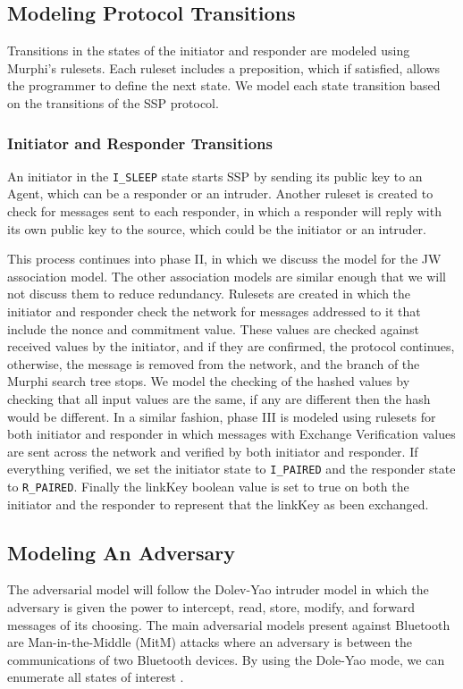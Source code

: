 \documentclass{acm_proc_article-sp}
\begin{document}
\subsection{Modeling Protocol Transitions}
Transitions in the states of the initiator and responder are modeled using Murphi's rulesets. Each ruleset includes a preposition, which if satisfied, allows the programmer to define the next state. We model each state transition based on the transitions of the SSP protocol.

\subsubsection{Initiator and Responder Transitions}

An initiator in the \texttt{I\_SLEEP} state starts SSP by sending its public key to an Agent, which can be a responder or an intruder. Another ruleset is created to check for messages sent to each responder, in which a responder will reply with its own public key to the source, which could be the initiator or an intruder.

This process continues into phase II, in which we discuss the model for the JW association model. The other association models are similar enough that we will not discuss them to reduce redundancy. Rulesets are created in which the initiator and responder check the network for messages addressed to it that include the nonce and commitment value. These values are checked against received values by the initiator, and if they are confirmed, the protocol continues, otherwise, the message is removed from the network, and the branch of the Murphi search tree stops. We model the checking of the hashed values by checking that all input values are the same, if any are different then the hash would be different. In a similar fashion, phase III is modeled using rulesets for both initiator and responder in which messages with Exchange Verification values are sent across the network and verified by both initiator and responder. If everything verified, we set the initiator state to \texttt{I\_PAIRED} and the responder state to \texttt{R\_PAIRED}. Finally the linkKey boolean value is set to true on both the initiator and the responder to represent that the linkKey as been exchanged.

\subsection{Modeling An Adversary}
The adversarial model will follow the Dolev-Yao intruder model \cite{dolev:yao} in which the adversary is given the power to intercept, read, store, modify, and forward messages of its choosing. The main adversarial models present against Bluetooth are Man-in-the-Middle (MitM) attacks where an adversary is between the communications of two Bluetooth devices. By using the Dole-Yao mode, we can enumerate all states of interest \cite{dolev:yao}.
\end{document}
